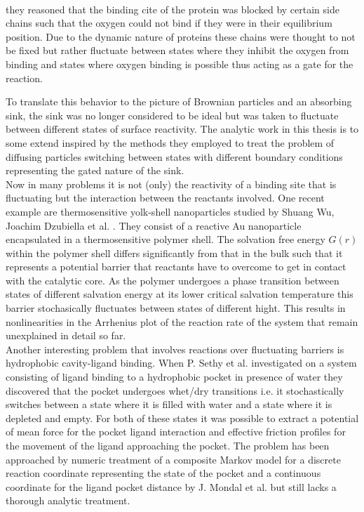 \vspace{0.3 cm} \\
they reasoned that the binding cite of the protein was blocked by certain side chains such that the oxygen could not bind if they were in their equilibrium position. Due to the dynamic nature of proteins these chains were thought to not be fixed but rather fluctuate between states where they inhibit the oxygen from binding and states where oxygen binding is possible thus acting as a gate for the reaction. \par
To translate this behavior to the picture of Brownian particles and an absorbing sink, the sink was no longer considered to be ideal but was taken to fluctuate between different states of surface reactivity. The analytic work in this thesis is to some extend inspired by the methods they employed to treat the problem of diffusing particles switching between states with different boundary conditions representing the gated nature of the sink. \\

Now in many problems it is not (only) the reactivity of a binding site that is fluctuating but the interaction between the reactants involved. One recent example are thermosensitive yolk-shell nanoparticles studied by Shuang Wu, Joachim Dzubiella et al. \cite{Wu2012a}. They consist of a reactive Au nanoparticle encapsulated in a thermosensitive polymer shell. The solvation free energy $G(r)$ within the polymer shell differs significantly from that in the bulk such that it represents a potential barrier that reactants have to overcome to get in contact with the catalytic core. As the polymer undergoes a phase transition between states of different salvation energy at its lower critical salvation temperature this barrier stochasically fluctuates between states of different hight. This results in nonlinearities in the Arrhenius plot of the reaction rate of the system that remain unexplained in detail so far.\\

Another interesting problem that involves reactions over fluctuating barriers is hydrophobic cavity-ligand binding. When P. Sethy et al. \cite{Setny2013} investigated on a system consisting of ligand binding to a hydrophobic pocket in presence of water they discovered that the pocket undergoes whet/dry transitions i.e. it stochastically switches between a state where it is filled with water and a state where it is depleted and empty. For both of these states it was possible to extract a potential of mean force for the pocket ligand interaction and effective friction profiles for the movement of the ligand approaching the pocket. The problem has been approached by numeric treatment of a composite Markov model for a discrete reaction coordinate representing the state of the pocket and a continuous coordinate for the ligand pocket distance by J. Mondal et al. \cite{Mondal2013} but still lacks a thorough analytic treatment. \\

